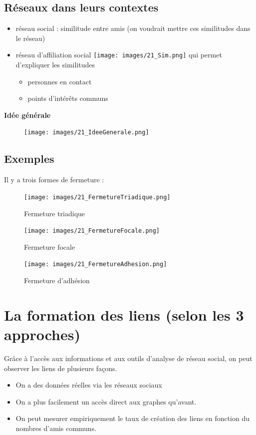 \subsection{Réseaux dans leurs contextes}
\begin{itemize}
\item réseau social : similitude entre amis (on voudrait mettre ces similitudes dans le réseau)
\item réseau d'affiliation social \texttt{[image: images/21\_Sim.png]} qui permet d'expliquer les similitudes
	\begin{itemize}
	\item personnes en contact
	\item points d'intérêts communs
	\end{itemize}
\end{itemize}

\vspace{1ex}
\textbf{Idée générale}

\begin{figure}[!ht]
	\centering
	\texttt{[image: images/21\_IdeeGenerale.png]}
\end{figure}

\subsection*{Exemples}
Il y a trois formes de fermeture :

\begin{figure}[!ht]
\begin{minipage}{\linewidth}
    \centering
    \begin{minipage}[t]{0.3\linewidth}
        \centering
        \texttt{[image: images/21\_FermetureTriadique.png]}
        \caption{Fermeture triadique}
    \end{minipage}
    \vrule
    \begin{minipage}[t]{0.3\textwidth}
        \centering
        \texttt{[image: images/21\_FermetureFocale.png]}
        \caption{Fermeture focale}
    \end{minipage}
    \vrule
    \begin{minipage}{0.3\textwidth}
        \centering
        \texttt{[image: images/21\_FermetureAdhesion.png]}
        \caption{Fermeture d'adhésion}
    \end{minipage}
\end{minipage}
\end{figure}

\section{La formation des liens (selon les 3 approches)}
Grâce à l'accès aux informations et aux outils d'analyse de réseau social, on peut observer les liens de plusieurs façons.
\begin{itemize}
\item On a des données réelles via les réseaux sociaux
\item On a plus facilement un accès direct aux graphes qu'avant.
\item On peut mesurer empiriquement le taux de création des liens en fonction du nombres d'amis communs.
\end{itemize}

